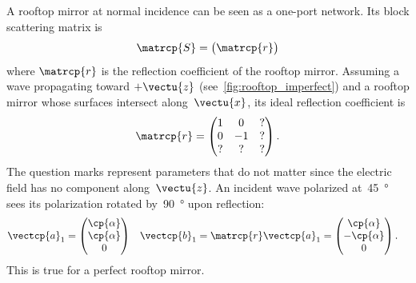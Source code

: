 \begin{refsection}
A rooftop mirror at normal incidence can be seen as a one-port network.
Its block scattering matrix is
\begin{equation}
    \matrcp{S} =
    \begin{pmatrix}
        \matrcp{r}
    \end{pmatrix}
\end{equation}
where $\matrcp{r}$ is the reflection coefficient of the rooftop mirror.
Assuming a wave propagating toward $+\vectu{z}$ (see~\cref{fig:rooftop_imperfect}) and a rooftop mirror whose surfaces intersect along~$\vectu{x}$,
its ideal reflection coefficient is
\begin{equation}
    \matrcp{r} =
    \begin{pmatrix}
        1 &  0 & ?\\
        0 & -1 & ?\\
        ? &  ? & ?
    \end{pmatrix}
    \text{.}
\end{equation}
The question marks represent parameters that do not matter since the electric field has no component along~$\vectu{z}$.
An incident wave polarized at~\SI{45}{\degree} sees its polarization rotated by~\SI{90}{\degree} upon reflection:
\begin{align}
    \vectcp{a}_1
    &=
    \begin{pmatrix}
        \cp{\alpha} \\ \cp{\alpha} \\ 0
    \end{pmatrix}
    &
    \vectcp{b}_1
    &= \matrcp{r} \vectcp{a}_1
    =
    \begin{pmatrix}
        \cp{\alpha} \\ -\cp{\alpha} \\ 0
    \end{pmatrix}
    \text{.}
\end{align}
This is true for a perfect rooftop mirror.


\end{refsection}
